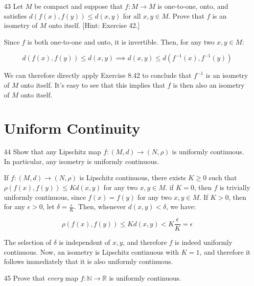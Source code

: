 \begin{exercise}{43}
    Let $M$ be compact and suppose that $f: M \rightarrow M$ is one-to-one, onto, and satisfies $d(f(x), f(y)) \leq d(x, y)$ for all $x, y \in M$.
    Prove that $f$ is an isometry of $M$ onto itself.
    [Hint: Exercise 42.]
\end{exercise}

\begin{solution}
    
    Since $f$ is both one-to-one and onto, it is invertible.
    Then, for any two $x, y \in M$:

    \[d(f(x), f(y)) \leq d(x, y) \implies d(x, y) \leq d(f^{-1}(x), f^{-1}(y))\]

    We can therefore directly apply Exercise 8.42 to conclude that $f^{-1}$ is an isometry of $M$ onto itself.
    It's easy to see that this implies that $f$ is then also an isometry of $M$ onto itself.
\end{solution}

\section{Uniform Continuity}

\begin{exercise}{44}
    Show that any Lipschitz map $f: (M, d) \rightarrow (N, \rho)$ is uniformly continuous.
    In particular, any isometry is uniformly continuous.
\end{exercise}

\begin{solution}
    
    If $f: (M, d) \rightarrow (N, \rho)$ is Lipschitz continuous, there exists $K \geq 0$ such that $\rho(f(x), f(y)) \leq K d(x, y)$ for any two $x, y \in M$.
    if $K = 0$, then $f$ is trivially uniformly continuous, since $f(x) = f(y)$ for any two $x, y \in M$.
    If $K > 0$, then for any $\epsilon > 0$, let $\delta = \frac{\epsilon}{K}$.
    Then, whenever $d(x, y) < \delta$, we have:

    \[\rho(f(x), f(y)) \leq K d(x, y) < K \frac{\epsilon}{K} = \epsilon\]

    The selection of $\delta$ is independent of $x, y$, and therefore $f$ is indeed uniformly continuous.
    Now, an isometry is Lipschitz continuous with $K = 1$, and therefore it follows immediately that it is also uniformly continuous.
\end{solution}

\begin{exercise}{45}
    Prove that \textit{every} map $f: \mathbb{N} \rightarrow \mathbb{R}$ is uniformly continuous.
\end{exercise}

